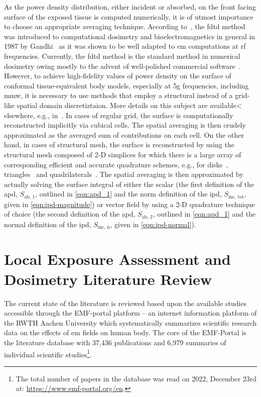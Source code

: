 As the power density distribution, either incident or absorbed, on the front facing surface of the exposed tissue is computed numerically, it is of utmost importance to choose an appropriate averaging technique.
According to~\cite{Foster2022Three}, the \gls{fdtd} method was introduced to computational dosimetry and bioelectromagnetics in general in 1987 by Gandhi~\cite{Sullivan1987Use} as it was shown to be well adapted to \gls{em} computations at \gls{rf} frequencies.
Currently, the \gls{fdtd} method is the standard method in numerical dosimetry owing mostly to the advent of well-polished commercial software~\cite{Hirata2021Human}.
However, to achieve high-fidelity values of power density on the surface of conformal tissue-equivalent body models, especially at \gls{5g} frequencies, including \gls{mmw}, it is necessary to use methods that employ a structural instead of a grid-like spatial domain discretiztaion.
More details on this subject are available< elsewhere, e.g., in~\cite{Poljak2018On}.
In cases of regular grid, the surface is computationally reconstructed implicitly via cubical cells.
The spatial averaging is then crudely approximated as the averaged sum of contributions on each cell.
On the other hand, in cases of structural mesh, the surface is reconstructed by using the structural mesh composed of 2-D simplices for which there is a large array of corresponding efficient and accurate quadrature schemes, e.g., for disks~\cite{Kim1997Symemetric}, triangles~\cite{Dunavant1985High} and quadrilaterals~\cite{Dunavant1985Economical}.
The spatial averaging is then approximated by actually solving the surface integral of either the scalar (the first definition of the \gls{apd}, $S_\text{ab, 1}$, outlined in \cref{eqn:apd_1} and the norm definition of the \gls{ipd}, $S_\text{inc, tot}$, given in \cref{eqn:ipd-magnitude}) or vector field by using a 2-D quadrature technique of choice (the second definition of the \gls{apd}, $S_\text{ab, 2}$, outlined in \cref{eqn:apd_1} and the normal definition of the \gls{ipd}, $S_\text{inc, n}$, given in \cref{eqn:ipd-normal}).

\section{Local Exposure Assessment and Dosimetry Literature Review}
The current state of the literature is reviewed based upon the available studies accessible through the EMF-portal platform -- an internet information platform of the RWTH Aachen University which systematically summarizes scientific research data on the effects of \gls{em} fields on human body.
The core of the EMF-Portal is the literature database with 37,436 publications and 6,979 summaries of individual scientific studies\footnote{The total number of papers in the database was read on 2022, December 23rd at: \url{https://www.emf-portal.org/en}.}.

